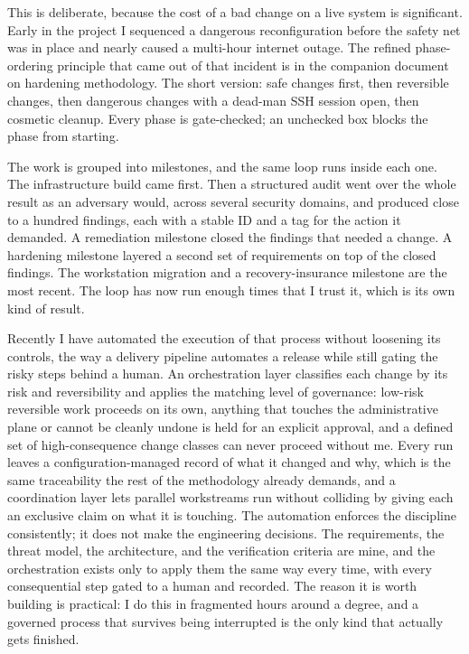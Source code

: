 \documentclass[12pt]{article}
\begin{document}
This is deliberate, because the cost of a bad change on a live system is significant. Early in the project I sequenced a dangerous reconfiguration before the safety net was in place and nearly caused a multi-hour internet outage. The refined phase-ordering principle that came out of that incident is in the companion document on hardening methodology. The short version: safe changes first, then reversible changes, then dangerous changes with a dead-man SSH session open, then cosmetic cleanup. Every phase is gate-checked; an unchecked box blocks the phase from starting.

The work is grouped into milestones, and the same loop runs inside each one. The infrastructure build came first. Then a structured audit went over the whole result as an adversary would, across several security domains, and produced close to a hundred findings, each with a stable ID and a tag for the action it demanded. A remediation milestone closed the findings that needed a change. A hardening milestone layered a second set of requirements on top of the closed findings. The workstation migration and a recovery-insurance milestone are the most recent. The loop has now run enough times that I trust it, which is its own kind of result.

Recently I have automated the execution of that process without loosening its controls, the way a delivery pipeline automates a release while still gating the risky steps behind a human. An orchestration layer classifies each change by its risk and reversibility and applies the matching level of governance: low-risk reversible work proceeds on its own, anything that touches the administrative plane or cannot be cleanly undone is held for an explicit approval, and a defined set of high-consequence change classes can never proceed without me. Every run leaves a configuration-managed record of what it changed and why, which is the same traceability the rest of the methodology already demands, and a coordination layer lets parallel workstreams run without colliding by giving each an exclusive claim on what it is touching. The automation enforces the discipline consistently; it does not make the engineering decisions. The requirements, the threat model, the architecture, and the verification criteria are mine, and the orchestration exists only to apply them the same way every time, with every consequential step gated to a human and recorded. The reason it is worth building is practical: I do this in fragmented hours around a degree, and a governed process that survives being interrupted is the only kind that actually gets finished.
\end{document}

